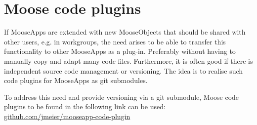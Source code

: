 \section{Moose code plugins}
\label{chap:patterns-code-plugins}

If MooseApps are extended with new MooseObjects that should be shared with
other users, e.g. in workgroups, the need arises to be able to transfer this
functionality to other MooseApps as a plug-in. Preferably without having to
manually copy and adapt many code files. Furthermore, it is often good if there
is independent source code management or versioning. The idea is to realise
such code plugins for MooseApps as git submodules.

To address this need and provide versioning via a git submodule, Moose code
plugins to be found in the following link can be used:
\href{https://github.com/jmeier/mooseapp-code-plugin}{github.com/jmeier/mooseapp-code-plugin}
